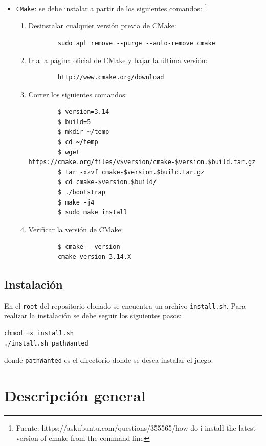 \documentclass[a4paper]{article}
\begin{document}
\begin{itemize}
	\item \texttt{CMake}: se debe instalar a partir de los siguientes comandos:
	\footnote{Fuente: https://askubuntu.com/questions/355565/how-do-i-install-the-latest-version-of-cmake-from-the-command-line}
	
	\begin{enumerate}
		\item Desinstalar cualquier versión previa de CMake:
		\begin{verbatim}
		sudo apt remove --purge --auto-remove cmake
		\end{verbatim}
		\item Ir a la página oficial de CMake y bajar la última versión: 
		\begin{verbatim}
		http://www.cmake.org/download
		\end{verbatim}
		\item Correr los siguientes comandos:
		\begin{verbatim}
		$ version=3.14
		$ build=5
		$ mkdir ~/temp
		$ cd ~/temp
		$ wget https://cmake.org/files/v$version/cmake-$version.$build.tar.gz
		$ tar -xzvf cmake-$version.$build.tar.gz
		$ cd cmake-$version.$build/
		$ ./bootstrap
		$ make -j4
		$ sudo make install
		\end{verbatim}
		\item Verificar la versión de CMake:
		\begin{verbatim}
		$ cmake --version
		cmake version 3.14.X
		\end{verbatim}
	\end{enumerate}
\end{itemize}

\subsection{Instalación}
En el \texttt{root} del repositorio clonado se encuentra un archivo \texttt{install.sh}. Para realizar la instalación se debe seguir los siguientes pasos:

\begin{verbatim}
chmod +x install.sh
./install.sh pathWanted
\end{verbatim}
donde \texttt{pathWanted} es el directorio donde se desea instalar el juego.

\section{Descripción general}
\end{document}
